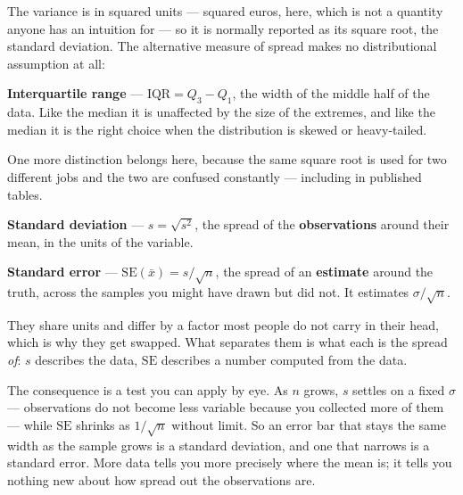 \documentclass[
  letterpaper,
  10pt,
  twoside,
  openright,
  numbers=noenddot,
  chapterprefix=true]{scrbook}
\begin{document}
The variance is in squared units --- squared euros, here, which is not a
quantity anyone has an intuition for --- so it is normally reported as
its square root, the standard deviation. The alternative measure of
spread makes no distributional assumption at all:

\begin{qmibdefinition}

{\textbf{Interquartile range}} --- \(\mathrm{IQR} = Q_3 - Q_1\), the
width of the middle half of the data. Like the median it is unaffected
by the size of the extremes, and like the median it is the right choice
when the distribution is skewed or heavy-tailed.

\end{qmibdefinition}

One more distinction belongs here, because the same square root is used
for two different jobs and the two are confused constantly --- including
in published tables.

\begin{qmibdefinition}

{\textbf{Standard deviation}} --- \(s = \sqrt{s^2}\), the spread of the
\textbf{observations} around their mean, in the units of the variable.

\end{qmibdefinition}

\begin{qmibdefinition}

{\textbf{Standard error}} --- \(\mathrm{SE}(\bar x) = s/\sqrt{n}\), the
spread of an \textbf{estimate} around the truth, across the samples you
might have drawn but did not. It estimates \(\sigma/\sqrt{n}\).

\end{qmibdefinition}

They share units and differ by a factor most people do not carry in
their head, which is why they get swapped. What separates them is what
each is the spread \emph{of}: \(s\) describes the data, \(\mathrm{SE}\)
describes a number computed from the data.

The consequence is a test you can apply by eye. As \(n\) grows, \(s\)
settles on a fixed \(\sigma\) --- observations do not become less
variable because you collected more of them --- while \(\mathrm{SE}\)
shrinks as \(1/\sqrt{n}\) without limit. So an error bar that stays the
same width as the sample grows is a standard deviation, and one that
narrows is a standard error. More data tells you more precisely where
the mean is; it tells you nothing new about how spread out the
observations are.
\end{document}
